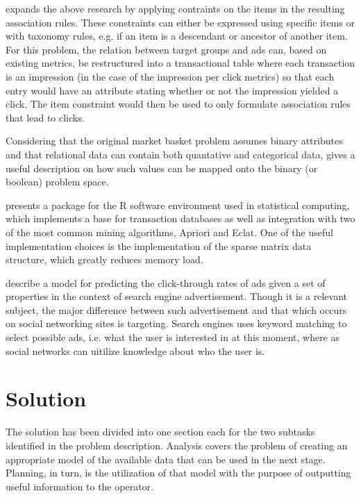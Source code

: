 \documentclass[a4paper]{article}
\begin{document}
\citet{Srikant1997} expands the above research by applying contraints on the items in the resulting association rules. These
constraints can either be expressed using specific items or with taxonomy rules, e.g. if an item is a descendant or ancestor
of another item. For this problem, the relation between target groups and ads can, based on existing metrics, be restructured into
a transactional table where each transaction is an impression (in the case of the impression per click metrics) so that each entry
would have an attribute stating whether or not the impression yielded a click. The item constraint would then be used to only
formulate association rules that lead to clicks.

Considering that the original market basket problem assumes binary attributes and that relational data can contain both
quantative and categorical data, \citep{Srikant1996} gives a useful description on how such values can be mapped onto the
binary (or boolean) problem space.

\citet{Hahsler2007} presents a package for the R software environment used in statistical computing, which implements a base
for transaction databases as well as integration with two of the most common mining algorithms, Apriori and Eclat. One of the
useful implementation choices is the implementation of the sparse matrix data structure, which greatly reduces memory load.

\citet{Richardson2007} describe a model for predicting the click-through rates of ads given a set of properties in the context
of search engine advertisement. Though it is a relevant subject, the major difference between such advertisement and that which
occurs on social networking sites is targeting. Search engines uses keyword matching to select possible ads, i.e. what the user is
interested in at this moment, where as social networks can uitilize knowledge about who the user is.

\section{Solution}
The solution has been divided into one section each for the two subtasks identified in the problem description. Analysis covers
the problem of creating an appropriate model of the available data that can be used in the next stage. Planning, in turn, is the
utilization of that model with the purpose of outputting useful information to the operator.
\end{document}
